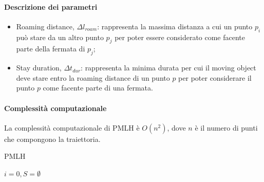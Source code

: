\documentclass[12pt]{article}
\begin{document}
\paragraph{Descrizione dei parametri}
\begin{itemize}
    \item  Roaming distance, $\Delta l_{roam}$: rappresenta la massima distanza a cui un punto $p_i$ può stare da un altro punto $p_j$ per poter essere considerato come facente parte della fermata di $p_j$;
    \item  Stay duration, $\Delta t_{dur}$: rappresenta la minima durata per cui il moving object deve stare entro la roaming distance di un punto $p$ per poter considerare il punto $p$ come facente parte di una fermata.
\end{itemize}
\paragraph{Complessità computazionale} La complessità computazionale di PMLH è $O(n^2)$, dove $n$ è il numero di punti che compongono la traiettoria.\\

\begin{algorithm}
    \caption{PMLH}\label{PMLH}
    $i = 0, S = \emptyset$\;
\end{algorithm}
\end{document}
